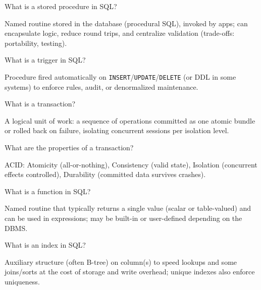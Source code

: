 \question[4]
What is a stored procedure in SQL?
\begin{solutionorbox}[1.2in]
  Named routine stored in the database (procedural SQL), invoked by apps; can encapsulate logic, reduce round trips, and centralize validation (trade-offs: portability, testing).
\end{solutionorbox}

\question[4]
What is a trigger in SQL?
\begin{solutionorbox}[1.2in]
  Procedure fired automatically on \texttt{INSERT}/\texttt{UPDATE}/\texttt{DELETE} (or DDL in some systems) to enforce rules, audit, or denormalized maintenance.
\end{solutionorbox}

\newpage


\question[4]
What is a transaction?
\begin{solutionorbox}[1.05in]
  A logical unit of work: a sequence of operations committed as one atomic bundle or rolled back on failure, isolating concurrent sessions per isolation level.
\end{solutionorbox}

\question[4]
What are the properties of a transaction?
\begin{solutionorbox}[1.25in]
  ACID: Atomicity (all-or-nothing), Consistency (valid state), Isolation (concurrent effects controlled), Durability (committed data survives crashes).
\end{solutionorbox}

\question[4]
What is a function in SQL?
\begin{solutionorbox}[1.15in]
  Named routine that typically returns a single value (scalar or table-valued) and can be used in expressions; may be built-in or user-defined depending on the DBMS.
\end{solutionorbox}

\question[4]
What is an index in SQL?
\begin{solutionorbox}[1.2in]
  Auxiliary structure (often B-tree) on column(s) to speed lookups and some joins/sorts at the cost of storage and write overhead; unique indexes also enforce uniqueness.
\end{solutionorbox}


\newpage

